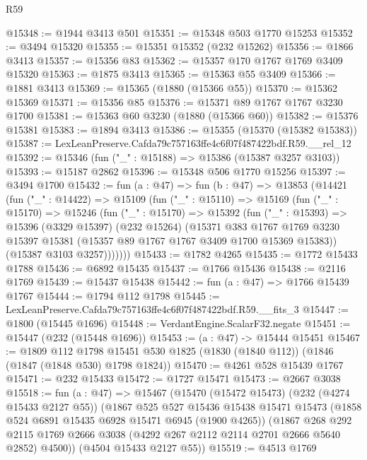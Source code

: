 \begin{lexlean}{R59}
\begin{coremodule}
@15348 := @1944 @3413 @501
@15351 := @15348 @503 @1770 @15253
@15352 := @3494 @15320
@15355 := @15351 @15352 (@232 @15262)
@15356 := @1866 @3413
@15357 := @15356 @83
@15362 := @15357 @170 @1767 @1769 @3409 @15320
@15363 := @1875 @3413
@15365 := @15363 @55 @3409
@15366 := @1881 @3413
@15369 := @15365 (@1880 (@15366 @55))
@15370 := @15362 @15369
@15371 := @15356 @85
@15376 := @15371 @89 @1767 @1767 @3230 @1700
@15381 := @15363 @60 @3230 (@1880 (@15366 @60))
@15382 := @15376 @15381
@15383 := @1894 @3413
@15386 := @15355 (@15370 (@15382 @15383))
@15387 := LexLeanPreserve.Cafda79c757163ffe4c6f07f487422bdf.R59.__rel_12
@15392 := @15346 (fun ("_" : @15188) => @15386 (@15387 @3257 @3103))
@15393 := @15187 @2862
@15396 := @15348 @506 @1770 @15256
@15397 := @3494 @1700
@15432 := fun (a : @47) =>
  fun (b : @47) =>
  @13853
    (@14421
      (fun ("_" : @14422) =>
      @15109
        (fun ("_" : @15110) =>
        @15169
          (fun ("_" : @15170) =>
          @15246
            (fun ("_" : @15170) =>
            @15392
              (fun ("_" : @15393) =>
              @15396
                (@3329 @15397)
                (@232 @15264)
                (@15371
                  @383
                  @1767
                  @1769
                  @3230
                  @15397
                  @15381
                  (@15357 @89 @1767 @1767 @3409 @1700 @15369 @15383))
                (@15387 @3103 @3257)))))))
@15433 := @1782 @4265
@15435 := @1772 @15433 @1788
@15436 := @6892 @15435
@15437 := @1766 @15436
@15438 := @2116 @1769
@15439 := @15437 @15438
@15442 := fun (a : @47) => @1766 @15439 @1767
@15444 := @1794 @112 @1798
@15445 := LexLeanPreserve.Cafda79c757163ffe4c6f07f487422bdf.R59.__fits_3
@15447 := @1800 (@15445 @1696)
@15448 := VerdantEngine.ScalarF32.negate
@15451 := @15447 (@232 (@15448 @1696))
@15453 := (a : @47) -> @15444 @15451
@15467 := @1809
    @112
    @1798
    @15451
    @530
    @1825
    (@1830 (@1840 @112))
    (@1846 (@1847 (@1848 @530) @1798 @1824))
@15470 := @4261 @528 @15439 @1767
@15471 := @232 @15433
@15472 := @1727 @15471
@15473 := @2667 @3038
@15518 := fun (a : @47) =>
  @15467
    (@15470
      (@15472 @15473)
      (@232 (@4274 @15433 @2127 @55))
      (@1867
        @525
        @527
        @15436
        @15438
        @15471
        @15473
        (@1858 @524 @6891 @15435 @6928 @15471 @6945 (@1900 @4265))
        (@1867
          @268
          @292
          @2115
          @1769
          @2666
          @3038
          (@4292 @267 @2112 @2114 @2701 @2666 @5640 @2852)
          @4500))
      (@4504 @15433 @2127 @55))
@15519 := @4513 @1769

\end{coremodule}
\end{lexlean}
